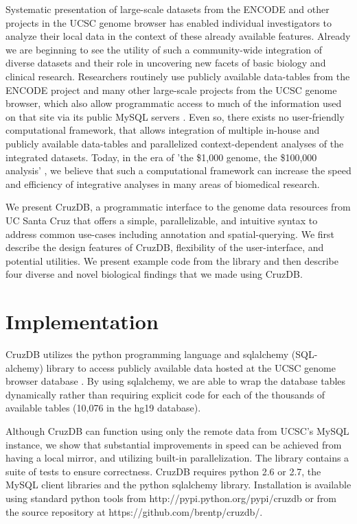 \documentclass[10pt]{bmc_article}
\newenvironment{bmcformat}{\baselineskip20pt\sloppy\setboolean{publ}{false}}{\baselineskip20pt\sloppy}
\begin{document}
\begin{bmcformat}
Systematic presentation of large-scale datasets from the ENCODE \cite{ENCODE} and other projects in the UCSC genome browser \cite{KentBrowser} has enabled individual investigators to analyze their local data in the context of these already available features. Already we are beginning to see the utility of such a community-wide integration of diverse datasets and their role in uncovering new facets of basic biology and clinical research. Researchers routinely use publicly available data-tables from the ENCODE project and many other large-scale projects from the UCSC genome browser, which also allow programmatic access to much of the information used on that site via its public MySQL servers \cite{Dreszer}. Even so, there exists no user-friendly computational framework, that allows integration of multiple in-house and publicly available data-tables and parallelized context-dependent analyses of the integrated datasets. Today, in the era of 'the \$1,000 genome, the \$100,000 analysis' \cite{Mardis}, we believe that such a computational framework can increase the speed and efficiency of integrative analyses in many areas of biomedical research. 

We present CruzDB, a programmatic interface to the genome data resources from UC Santa Cruz \cite{Dreszer} that offers a simple, parallelizable, and intuitive syntax to address common use-cases including annotation and spatial-querying. We first describe the design features of CruzDB, flexibility of the user-interface, and potential utilities. We present example code from the library and then describe four diverse and novel biological findings that we made using CruzDB.


\section*{Implementation}
CruzDB utilizes the python programming language and sqlalchemy (SQL-alchemy) library to access publicly available data hosted at the UCSC genome browser database\cite{Dreszer} . By using sqlalchemy, we are able to wrap the database tables dynamically rather than requiring explicit code for each of the thousands of available tables (10,076 in the hg19 database). 

Although CruzDB can function using only the remote data from UCSC's MySQL instance, we show that  substantial improvements in speed can be achieved from having a local mirror, and utilizing built-in parallelization. The library contains a suite of tests to ensure correctness. CruzDB requires python 2.6 or 2.7, the MySQL client libraries and the python sqlalchemy library. Installation is available using standard python tools from http://pypi.python.org/pypi/cruzdb or from the source repository at https://github.com/brentp/cruzdb/.


\end{bmcformat}
\end{document}
